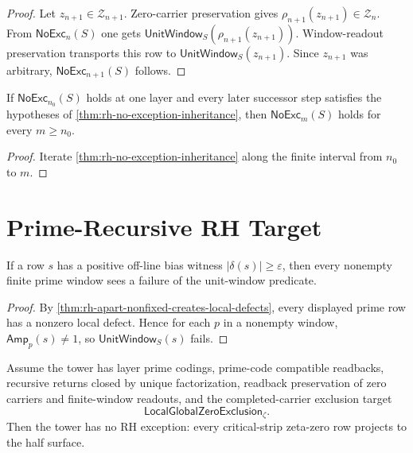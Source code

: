 \begin{proof}
Let $z_{n+1}\in\mathcal Z_{n+1}$. Zero-carrier preservation gives
$\rho_{n+1}(z_{n+1})\in\mathcal Z_n$. From $\mathsf{NoExc}_{n}(S)$ one
gets $\mathsf{UnitWindow}_{S}(\rho_{n+1}(z_{n+1}))$. Window-readout
preservation transports this row to
$\mathsf{UnitWindow}_{S}(z_{n+1})$. Since $z_{n+1}$ was arbitrary,
$\mathsf{NoExc}_{n+1}(S)$ follows.
\end{proof}

\begin{corollary}
\label{cor:rh-recursive-no-exception-propagation}
If $\mathsf{NoExc}_{n_0}(S)$ holds at one layer and every later successor
step satisfies the hypotheses of \autoref{thm:rh-no-exception-inheritance},
then $\mathsf{NoExc}_{m}(S)$ holds for every $m\ge n_0$.
\end{corollary}

\begin{proof}
Iterate \autoref{thm:rh-no-exception-inheritance} along the finite interval
from $n_0$ to $m$.
\end{proof}

\section{Prime-Recursive RH Target}
\label{sec:rh-prime-recursive-rh-target}

\begin{theorem}
\label{thm:rh-exception-visibility-finite-windows}
If a row $s$ has a positive off-line bias witness
$|\delta(s)|\ge\varepsilon$, then every nonempty finite prime window sees a
failure of the unit-window predicate.
\end{theorem}

\begin{proof}
By \autoref{thm:rh-apart-nonfixed-creates-local-defects}, every displayed
prime row has a nonzero local defect. Hence for each $p$ in a nonempty
window, $\mathsf{Amp}_{p}(s)\ne 1$, so
$\mathsf{UnitWindow}_{S}(s)$ fails.
\end{proof}

\begin{theorem}
\label{thm:rh-prime-recursive-no-exception-target}
Assume the tower has layer prime codings, prime-code compatible readbacks,
recursive returns closed by unique factorization, readback preservation of
zero carriers and finite-window readouts, and the completed-carrier
exclusion target
$$
\mathsf{LocalGlobalZeroExclusion}_{\zeta}.
$$
Then the tower has no RH exception: every critical-strip zeta-zero row
projects to the half surface.
\end{theorem}


